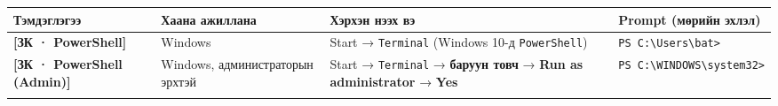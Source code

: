\begingroup\scriptsize\begin{longtable}[]{@{}llll@{}}
\toprule
\begin{minipage}[b]{0.22\columnwidth}\raggedright
Тэмдэглэгээ\strut
\end{minipage} & \begin{minipage}[b]{0.22\columnwidth}\raggedright
Хаана ажиллана\strut
\end{minipage} & \begin{minipage}[b]{0.22\columnwidth}\raggedright
Хэрхэн нээх вэ\strut
\end{minipage} & \begin{minipage}[b]{0.22\columnwidth}\raggedright
Prompt (мөрийн эхлэл)\strut
\end{minipage}\tabularnewline
\midrule
\endhead
\begin{minipage}[t]{0.22\columnwidth}\raggedright
\textbf{{[}ЗК · PowerShell{]}}\strut
\end{minipage} & \begin{minipage}[t]{0.22\columnwidth}\raggedright
Windows\strut
\end{minipage} & \begin{minipage}[t]{0.22\columnwidth}\raggedright
Start → \texttt{Terminal} (Windows 10-д \texttt{PowerShell})\strut
\end{minipage} & \begin{minipage}[t]{0.22\columnwidth}\raggedright
\texttt{PS\ C:\allowbreak{}\textbackslash{}\allowbreak{}Users\textbackslash{}\allowbreak{}bat\textgreater{}}\strut
\end{minipage}\tabularnewline
\begin{minipage}[t]{0.22\columnwidth}\raggedright
\textbf{{[}ЗК · PowerShell (Admin){]}}\strut
\end{minipage} & \begin{minipage}[t]{0.22\columnwidth}\raggedright
Windows, администраторын эрхтэй\strut
\end{minipage} & \begin{minipage}[t]{0.22\columnwidth}\raggedright
Start → \texttt{Terminal} → \textbf{баруун товч} → \textbf{Run as administrator} → \textbf{Yes}\strut
\end{minipage} & \begin{minipage}[t]{0.22\columnwidth}\raggedright
\texttt{PS\ C:\allowbreak{}\textbackslash{}\allowbreak{}WINDOWS\textbackslash{}\allowbreak{}system32\textgreater{}}\strut
\end{minipage}\tabularnewline
\begin{minipage}[t]{0.22\columnwidth}\raggedright

\end{minipage}
\end{longtable}
